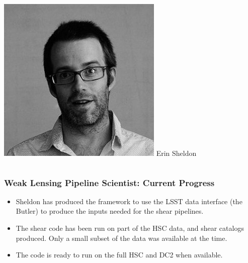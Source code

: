 \documentclass[aspectratio=169]{beamer}
\begin{document}
{\begin{columns}
        \begin{column}{0.3\textwidth}
            \begin{center}
                \includegraphics[width=\textwidth]{sheldon.png}
                \newline
                {\tiny Erin Sheldon}
            \end{center}
        \end{column}

    \end{columns}

}

\frame
{

    \frametitle{Weak Lensing Pipeline Scientist: Current Progress}


    \begin{itemize}

        \item Sheldon has produced the framework to
            use the LSST data interface (the Butler) to
            produce the inputs needed for the shear
            pipelines.

        \item The shear code has been run on part of the HSC data, and shear
            catalogs produced.  Only a small subset of the data was available
            at the time.

        \item The code is ready to run on the full HSC and DC2 when available.

    \end{itemize}
}
\end{document}
